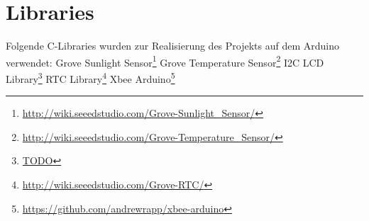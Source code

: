 \documentclass{article}
\begin{document}
\section{Libraries}
Folgende C-Libraries wurden zur Realisierung des Projekts auf dem Arduino verwendet: \newline
Grove Sunlight Sensor\footnote{\label{Light}\url{http://wiki.seeedstudio.com/Grove-Sunlight_Sensor/}}\newline
Grove Temperature Sensor\footnote{\label{Temperature}\url{http://wiki.seeedstudio.com/Grove-Temperature_Sensor/}}\newline
I2C LCD Library\footnote{\label{LCD}\url{TODO}}\newline
RTC Library\footnote{\label{RTC}\url{http://wiki.seeedstudio.com/Grove-RTC/}}\newline
Xbee Arduino\footnote{\label{Xbee}\url{https://github.com/andrewrapp/xbee-arduino}}\newline
\end{document}

